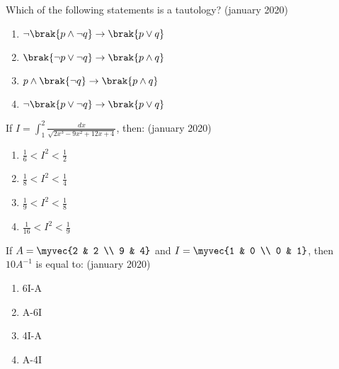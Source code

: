     \item Which of the following statements is a tautology?
\hfill{(january 2020)}
    \begin{enumerate}
        \item $\neg\brak{p \land \neg q} \rightarrow \brak{p \lor q}$
        \item $\brak{\neg p \lor \neg q} \rightarrow \brak{p \land q}$
        \item $ p \land \brak{\neg q} \rightarrow \brak{p \land q}$
        \item $\neg\brak{p \lor \neg q} \rightarrow \brak{p \lor q}$
    \end{enumerate}
    \item If $I=\int_{1}^{2} \frac{dx}{\sqrt{2x^3-9x^2+12x+4}}$, then:
\hfill{(january 2020)}
    \begin{enumerate}
        \item $\frac{1}{6}<I^2<\frac{1}{2}$
        \item $\frac{1}{8}<I^2<\frac{1}{4}$
        \item $\frac{1}{9}<I^2<\frac{1}{8}$
        \item $\frac{1}{16}<I^2<\frac{1}{9}$
    \end{enumerate}
    \item If $A = \myvec{2 & 2 \\ 9 & 4} $ and $I=\myvec{1 & 0 \\ 0 & 1}$, then $10 A^{-1}$ is equal to:
\hfill{(january 2020)}
    \begin{enumerate}
        \item 6I-A
        \item A-6I
        \item 4I-A
         \item A-4I
    \end{enumerate} 

